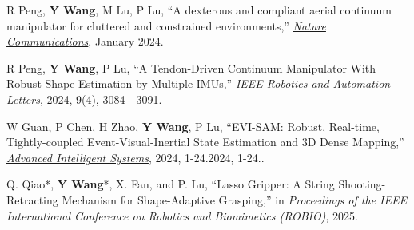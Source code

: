 \begin{publications}
\newcommand{\JourConfTitle}[1]{\ul{\emph{#1}}}


\begin{journals}
\item R Peng, \textbf{Y Wang}, M Lu, P Lu, ``A dexterous and compliant aerial continuum manipulator for cluttered and constrained environments,'' \JourConfTitle{Nature Communications}, January 2024.

\item R Peng, \textbf{Y Wang}, P Lu, ``A Tendon-Driven Continuum Manipulator With Robust Shape Estimation by Multiple IMUs,'' \JourConfTitle{ IEEE Robotics and Automation Letters}, 2024, 9(4), 3084 - 3091.

\item W Guan, P Chen, H Zhao,  \textbf{Y Wang}, P Lu, ``EVI-SAM: Robust, Real-time, Tightly-coupled Event-Visual-Inertial State Estimation and 3D Dense Mapping,'' \JourConfTitle{Advanced Intelligent Systems}, 2024, 1-24.2024, 1-24.. 

\end{journals}
\begin{conferences}
\item Q. Qiao*, \textbf{Y Wang}*, X. Fan, and P. Lu, ``Lasso Gripper: A String Shooting-Retracting Mechanism for Shape-Adaptive Grasping,'' in \textit{Proceedings of the IEEE International Conference on Robotics and Biomimetics (ROBIO)}, 2025.
\end{conferences}



\end{publications}
